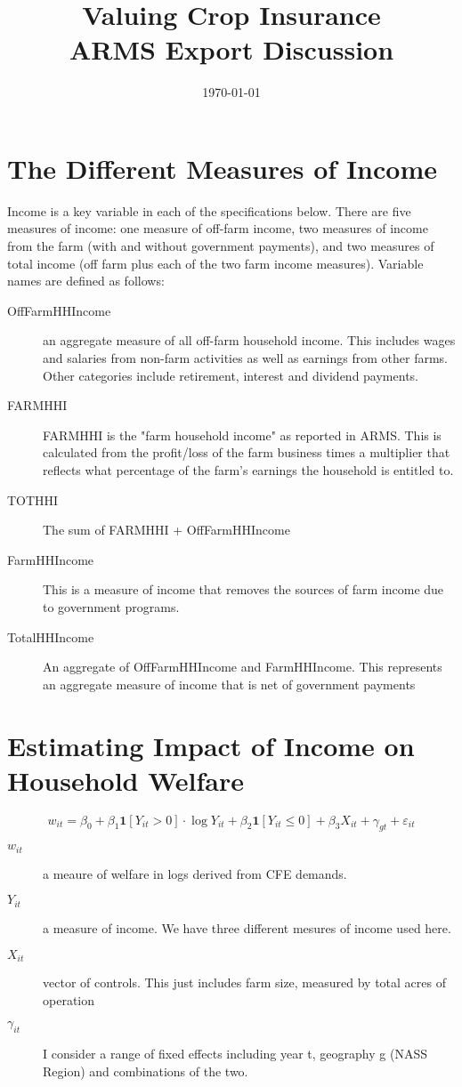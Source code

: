 \documentclass[11pt]{article}
\date{\today}
\title{Valuing Crop Insurance\\\medskip
\large ARMS Export Discussion}
\begin{document}
\maketitle

\section{The Different Measures of Income}
\label{sec:orgf0adcf6}
Income is a key variable in each of the specifications below. There are five measures of income: one measure of off-farm income, two measures of income from the farm (with and without government payments), and two measures of total income (off farm plus each of the two farm income measures). Variable names are defined as follows:
\begin{description}
\item[{OffFarmHHIncome}] an aggregate measure of all off-farm household income. This includes wages and salaries from non-farm activities as well as earnings from other farms. Other categories include retirement, interest and dividend payments.
\item[{FARMHHI}] FARMHHI is the "farm household income" as reported in ARMS. This is calculated from the profit/loss of the farm business times a multiplier that reflects what percentage of the farm's earnings the household is entitled to.
\item[{TOTHHI}] The sum of FARMHHI + OffFarmHHIncome
\item[{FarmHHIncome}] This is a measure of income that removes the sources of farm income due to government programs.
\item[{TotalHHIncome}] An aggregate of OffFarmHHIncome and FarmHHIncome. This represents an aggregate measure of income that is net of government payments
\end{description}


\section{Estimating Impact of Income on Household Welfare}
\label{sec:orgad53bb8}

\[
w_{it} = \beta_{0} + \beta_{1}\mathbf{1}[Y_{it} >  0] \cdot \log{Y_{it}} + \beta_{2}\mathbf{1}[Y_{it} \leq 0 ] + \beta_{3} X_{it} + \gamma_{gt} + \varepsilon_{it}
\]

\begin{description}
\item[{\(w_{it}\)}] a meaure of welfare in logs derived from CFE demands.
\item[{\(Y_{it}\)}] a measure of income. We have three different mesures of income used here.
\item[{\(X_{it}\)}] vector of controls. This just includes farm size, measured by total acres of operation
\item[{\(\gamma_{it}\)}] I consider a range of fixed effects including year t, geography g (NASS Region) and combinations of the two.
\end{description}
\end{document}
